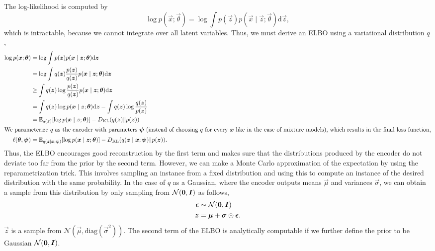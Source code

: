 The log-likelihood is computed by \[
    \log p(\vec{x}; \vec{\theta}) = \log \int p(\vec{z}) p(\vec{x} \mid \vec{z}; \vec{\theta}) \mathrm{d}\vec{z},
\]
which is intractable, because we cannot integrate over all latent variables. Thus, we must derive
an ELBO using a variational distribution $q$,
\begin{align*}
    \log p(\bm{x}; \bm{\theta})  & = \log \int p(\bm{z}) p(\bm{x} \mid \bm{z}; \bm{\theta}) \mathrm{d}\bm{z}                                                                               \\
                                   & = \log \int q(\bm{z}) \frac{p(\bm{z})}{q(\bm{z})} p(\bm{x} \mid \bm{z}; \bm{\theta}) \mathrm{d}\bm{z}                                                 \\
                                   & \geq \int q(\bm{z}) \log \frac{p(\bm{z})}{q(\bm{z})} p(\bm{x} \mid \bm{z}; \bm{\theta}) \mathrm{d}\bm{z}                                              \\
                                   & = \int q(\bm{z}) \log p(\bm{x} \mid \bm{z}; \bm{\theta}) \mathrm{d}\bm{z} - \int q(\bm{z}) \log \frac{q(\bm{z})}{p(\bm{z})}                          \\
                                   & = \mathbb{E}_{q(\bm{z})}[\log p(\bm{x} \mid \bm{z}; \bm{\theta})] - D_{\mathrm{KL}}(q(\bm{z}) \| p(\bm{z}))                                                    \\
    \intertext{We parameterize $q$ as the encoder with parameters $\bm{\psi}$ (instead of choosing $q$ for every $\bm{x}$ like in the case of mixture models), which results in the final loss function,}
    \ell(\bm{\theta}, \bm{\psi}) & = \mathbb{E}_{q(\bm{z} \mid \bm{x}; \bm{\psi})}[\log p(\bm{x} \mid \bm{z}; \bm{\theta})] - D_{\mathrm{KL}}(q(\bm{z} \mid \bm{x}; \bm{\psi}) \| p(\bm{z})).
\end{align*}
Thus, the ELBO encourages good reconstruction by the first term and makes sure that the distributions
produced by the encoder do not deviate too far from the prior by the second term. However, we can
make a Monte Carlo approximation of the expectation by using the reparametrization trick. This
involves sampling an instance from a fixed distribution and using this to compute an instance of the desired
distribution with the same probability. In the case of $q$ as a Gaussian, where the encoder outputs
means $\vec{\mu}$ and variances $\vec{\sigma}$, we can obtain a sample from this distribution by
only sampling from $\mathcal{N}(\bm{0}, \bm{I})$ as follows,
\begin{align*}
    \bm{\epsilon} & \sim \mathcal{N}(\bm{0}, \bm{I})               \\
    \bm{z}        & = \bm{\mu} + \bm{\sigma} \odot \bm{\epsilon}.
\end{align*}
$\vec{z}$ is a sample from $\mathcal{N}(\vec{\mu}, \mathrm{diag}(\vec{\sigma}^2))$. The second term
of the ELBO is analytically computable if we further define the prior to be Gaussian
$\mathcal{N}(\bm{0}, \bm{I})$.

